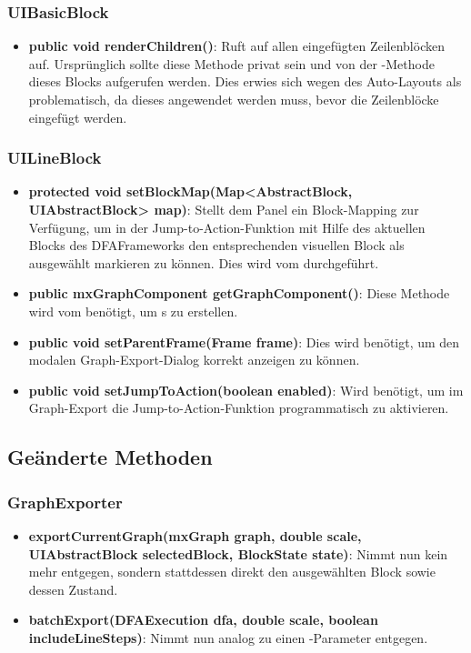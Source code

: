 \subsubsection{UIBasicBlock}
\begin{itemize}
  \item \textbf{public void renderChildren()}: Ruft  auf allen eingefügten Zeilenblöcken auf. Ursprünglich sollte diese Methode privat sein und von der -Methode dieses Blocks aufgerufen werden. Dies erwies sich wegen des Auto-Layouts als problematisch, da dieses angewendet werden muss, bevor die Zeilenblöcke eingefügt werden.
\end{itemize}

\subsubsection{UILineBlock}
\begin{itemize}
  \item \textbf{protected void setBlockMap(Map<AbstractBlock, UIAbstractBlock> map)}: Stellt dem Panel ein Block-Mapping zur Verfügung, um in der Jump-to-Action-Funktion mit Hilfe des aktuellen Blocks des DFAFrameworks den entsprechenden visuellen Block als ausgewählt markieren zu können. Dies wird vom  durchgeführt.
  \item \textbf{public mxGraphComponent getGraphComponent()}: Diese Methode wird vom  benötigt, um s zu erstellen.
  \item \textbf{public void setParentFrame(Frame frame)}: Dies wird benötigt, um den modalen Graph-Export-Dialog korrekt anzeigen zu können.
  \item \textbf{public void setJumpToAction(boolean enabled)}: Wird benötigt, um im Graph-Export die Jump-to-Action-Funktion programmatisch zu aktivieren.
\end{itemize}

\subsection{Geänderte Methoden}

\subsubsection{GraphExporter}

\begin{itemize}
  \item \textbf{exportCurrentGraph(mxGraph graph, double scale, UIAbstractBlock selectedBlock, BlockState state)}: Nimmt nun kein  mehr entgegen, sondern stattdessen direkt den ausgewählten Block sowie dessen Zustand.
  \item \textbf{batchExport(DFAExecution dfa, double scale, boolean includeLineSteps)}: Nimmt nun analog zu  einen -Parameter entgegen.
\end{itemize}


